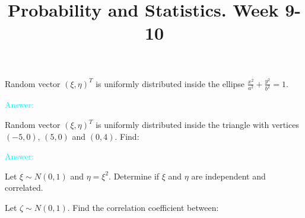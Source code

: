 \documentclass[14pt]{exam}
\title{Probability and Statistics. Week 9-10}
\date{}
\def\Var{{\textrm{Var}}\,}
\def\E{{\textrm{E}}\,}
\begin{document}
	\maketitle
	
	
	\begin{questions}
		\question
		Random vector $(\xi, \eta)^T$ is uniformly distributed inside the ellipse $\frac{x^2}{a^2} + \frac{y^2}{b^2} = 1$.
		\textcolor{cyan}{Answer:}
		
		\question
		Random vector $(\xi, \eta)^T$ is uniformly distributed inside the triangle with vertices $(-5, 0)$, $(5, 0)$ and $(0, 4)$.
		Find: 
		\textcolor{cyan}{Answer:}
		
		
		\question
		Let $\xi \sim N(0, 1)$ and $\eta = \xi^2$. Determine if $\xi$ and $\eta$ are independent and correlated.
		
		\question
		Let $\zeta \sim N(0, 1)$. Find the correlation coefficient between:
\end{questions}
\end{document}
